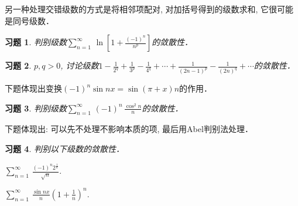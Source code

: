 \documentclass[11pt,a4paper]{ctexart}
\makeatletter
\theoremstyle{thmseries} %
\theoremstyle{exerseries}
\newtheorem{exer}{习题}[section]
\renewenvironment{proof}[1][\proofname]{\par
  \pushQED{\qed}%
  \normalfont \topsep6\p@\@plus6\p@\relax
  \trivlist
  \item[\hskip\labelsep
        \itshape
    #1\@addpunct{}]\ignorespaces
}{%
  \popQED\endtrivlist\@endpefalse
}
\newenvironment{pf}{\begin{proof}[\bfseries\upshape 证\quad]}{\end{proof}}
\newcommand{\bra}[1]{\mathopen{}\left(#1\right)}
\newcommand{\sbra}[1]{\mathopen{}\left[#1\right]}
\def \tseries {{\textstyle\sum\limits_{n=1}^{\infty}}\,} %
\def \dseries {\sum_{n=1}^{\infty}\,} %
\makeatother
\begin{document}

另一种处理交错级数的方式是将相邻项配对, 对加括号得到的级数求和, 它很可能是同号级数．
\begin{exer}
	判别级数$\tseries\ln\sbra{1+\frac{(-1)^n}{n^p}}$的敛散性．
\end{exer}

\begin{exer}
	$p,q>0$, 讨论级数$1-\frac{1}{2^q}+\frac{1}{3^p}-\frac{1}{4^q}+\cdots+\frac{1}{(2n-1)^p}-\frac{1}{(2n)^q}+\cdots$的敛散性．
\end{exer}

下题体现出变换$(-1)^n\sin nx=\sin(\pi+x)n$的作用．
\begin{exer}
	判别级数$\tseries(-1)^n\,\frac{\cos^2n}{n}$的敛散性．
\end{exer}

下题体现出: 可以先不处理不影响本质的项, 最后用Abel判别法处理．
\begin{exer}
	判别以下级数的敛散性．\vspace{-.5em}
	\begin{enumerate}
	\end{enumerate}
\end{exer}
\end{document}
